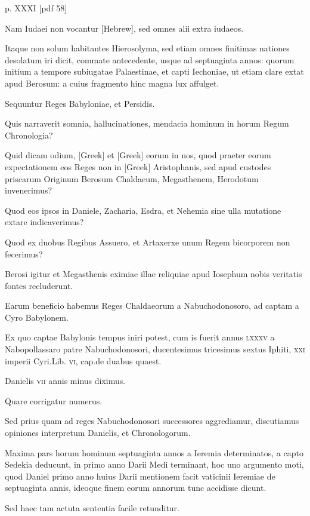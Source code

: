 \begin{parnumbers}
\clearpage
p. XXXI [pdf 58]

Nam Iudaei
non vocantur \texthebrew{[Hebrew]}, sed omnes alii extra iudaeos.

Itaque non solum
habitantes Hierosolyma, sed etiam omnes finitimas nationes desolatum
iri dicit, commate antecedente, usque ad septuaginta annos:
quorum initium a tempore subiugatae Palaestinae, et capti Iechoniae,
ut etiam clare extat apud Berosum: a cuius fragmento hinc
magna lux affulget.

Sequuntur Reges Babyloniae, et Persidis.

Quis narraverit somnia, hallucinationes, mendacia hominum in horum
Regum Chronologia?

Quid dicam odium, \textgreek{[Greek]} et \textgreek{[Greek]}
eorum in nos, quod praeter eorum expectationem eos Reges non
in \textgreek{[Greek]} Aristophanis, sed apud custodes priscarum Originum
Berosum Chaldaeum, Megasthenem, Herodotum invenerimus?

Quod eos ipsos in Daniele, Zacharia, Esdra, et Nehemia sine
ulla mutatione extare indicaverimus?

Quod ex duobus Regibus
Assuero, et Artaxerxe unum Regem bicorporem non fecerimus?

Berosi igitur et Megasthenis eximiae illae reliquiae apud Iosephum
nobis veritatis fontes recluderunt.

Earum beneficio habemus Reges
Chaldaeorum a Nabuchodonosoro, ad captam a Cyro Babylonem.

Ex quo captae Babylonis tempus iniri potest, cum is fuerit annus
\textsc{lxxxv} a Nabopollassaro patre Nabuchodonosori, ducentesimus
tricesimus sextus Iphiti,
 \textsc{xxi} imperii Cyri.Lib. \textsc{vi}, cap.de duabus
quaest.

Danielis \textsc{vii} annis minus diximus.

Quare corrigatur
numerus.

Sed prius quam ad reges Nabuchodonosori successores aggrediamur,
discutiamus opiniones interpretum Danielis, et Chronologorum.

Maxima pars horum hominum septuaginta annos a
Ieremia determinatos, a capto Sedekia deducunt, in primo anno
Darii Medi terminant, hoc uno argumento moti, quod Daniel primo
anno huius Darii mentionem facit vaticinii Ieremiae de septuaginta
annis, ideoque finem eorum annorum tunc accidisse dicunt.

Sed haec tam actuta sententia facile retunditur.


\end{parnumbers}
